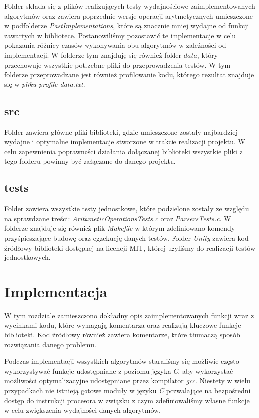 \documentclass{article}
\begin{document}
Folder składa się z plików realizujących testy wydajnościowe zaimplementowanych algorytmów oraz zawiera poprzednie wersje operacji arytmetycznych umieszczone w podfolderze \textit{PastImplementations}, które są znacznie mniej wydajne od funkcji zawartych w bibliotece. Postanowiliśmy pozostawić te implementacje w celu pokazania różnicy czasów wykonywania obu algorytmów w zależności od implementacji. W folderze tym znajduję się również folder $data$, który przechowuje wszystkie potrzebne pliki do przeprowadzenia testów. W tym folderze przeprowadzane jest również profilowanie kodu, którego rezultat znajduje się w \textit{pliku profile-data.txt}.

\subsection{src}

Folder zawiera główne pliki biblioteki, gdzie umieszczone zostały najbardziej wydajne i optymalne implementacje stworzone w trakcie realizacji projektu. W celu zapewnienia poprawności działania dołączanej biblioteki wszystkie pliki z tego folderu powinny być załączane do danego projektu.

\subsection{tests}

Folder zawiera wszystkie testy jednostkowe, które podzielone zostały ze względu na sprawdzane treści: \textit{ArithmeticOperationsTests.c} oraz \textit{ParsersTests.c}. W folderze znajduje się również plik \textit{Makefile} w którym zdefiniowano komendy przyśpieszające budowę oraz egzekucję danych testów. Folder \textit{Unity} zawiera kod źródłowy biblioteki dostępnej na licencji MIT, której użyliśmy do realizacji testów jednostkowych.

\section{Implementacja} \label{Implementacja}

W tym rozdziale zamieszczono dokładny opis zaimplementowanych funkcji wraz z wycinkami kodu, które wymagają komentarza oraz realizują kluczowe funkcje biblioteki. Kod źródłowy również zawiera komentarze, które tłumaczą sposób rozwiązania danego problemu. 

Podczas implementacji wszystkich algorytmów staraliśmy się możliwie często wykorzystywać funkcje udostępniane z poziomu języka \textit{C}, aby wykorzystać możliwości optymalizacyjne udostępniane przez kompilator \textit{gcc}. Niestety w wielu przypadkach nie istnieją gotowe moduły w języku \textit{C} pozwalające na bezpośredni dostęp do instrukcji procesora w związku z czym zdefiniowaliśmy własne funkcje w celu zwiększenia wydajności danych algorytmów.
\end{document}
